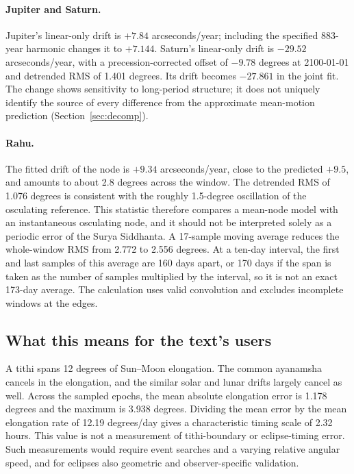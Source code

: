 \documentclass[11pt,a4paper]{article}
\begin{document}
\paragraph{Jupiter and Saturn.} Jupiter's linear-only drift is $+7.84$ arcseconds/year; including the specified 883-year harmonic changes it to $+7.144$. Saturn's linear-only drift is $-29.52$ arcseconds/year, with a precession-corrected offset of $-9.78$ degrees at 2100-01-01 and detrended RMS of 1.401 degrees. Its drift becomes $-27.861$ in the joint fit. The change shows sensitivity to long-period structure; it does not uniquely identify the source of every difference from the approximate mean-motion prediction (Section~\ref{sec:decomp}).

\paragraph{Rahu.} The fitted drift of the node is $+9.34$ arcseconds/year, close to the predicted $+9.5$, and amounts to about 2.8 degrees across the window. The detrended RMS of 1.076 degrees is consistent with the roughly 1.5-degree oscillation of the osculating reference. This statistic therefore compares a mean-node model with an instantaneous osculating node, and it should not be interpreted solely as a periodic error of the Surya Siddhanta. A 17-sample moving average reduces the whole-window RMS from 2.772 to 2.556 degrees. At a ten-day interval, the first and last samples of this average are 160 days apart, or 170 days if the span is taken as the number of samples multiplied by the interval, so it is not an exact 173-day average. The calculation uses valid convolution and excludes incomplete windows at the edges.

\subsection{What this means for the text's users}

A tithi spans 12 degrees of Sun--Moon elongation. The common ayanamsha cancels in the elongation, and the similar solar and lunar drifts largely cancel as well. Across the sampled epochs, the mean absolute elongation error is 1.178 degrees and the maximum is 3.938 degrees. Dividing the mean error by the mean elongation rate of 12.19 degrees/day gives a characteristic timing scale of 2.32 hours. This value is not a measurement of tithi-boundary or eclipse-timing error. Such measurements would require event searches and a varying relative angular speed, and for eclipses also geometric and observer-specific validation.
\end{document}
